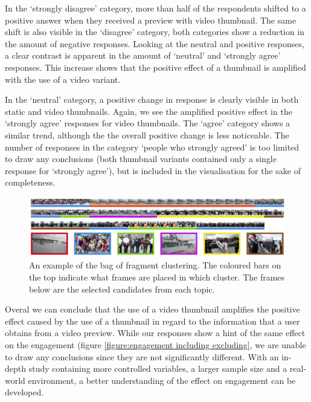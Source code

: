 \documentclass{../resources/sig-alternate-05-2015}
\begin{document}
In the `strongly disagree' category, more than half of the respondents shifted to a positive answer when they received a preview with video thumbnail. The same shift is also visible in the `disagree' category, both categories show a reduction in the amount of negative responses. Looking at the neutral and positive responses, a clear contrast is apparent in the amount of `neutral' and `strongly agree' responses. This increase shows that the positive effect of a thumbnail is amplified with the use of a video variant.

In the `neutral' category, a positive change in response is clearly visible in both static and video thumbnails. Again, we see the amplified positive effect in the `strongly agree' responses for video thumbnails. The `agree' category shows a similar trend, although the the overall positive change is less noticeable. The number of responses in the category `people who strongly agreed' is too limited to draw any conclusions (both thumbnail variants contained only a single response for `strongly agree'), but is included in the visualisation for the sake of completeness.

\begin{figure}[tb!]
	\centering
	\includegraphics[width=\textwidth]{resources/clustering.png}
	\caption{An example of the bag of fragment clustering. The coloured bars on the top indicate what frames are placed in which cluster. The frames below are the selected candidates from each topic.}
	\label{figure: topic clustering example}
\end{figure}

Overal we can conclude that the use of a video thumbnail amplifies the positive effect caused by the use of a thumbnail in regard to the information that a user obtains from a video preview. While our responses show a hint of the same effect on the engagement (figure \ref{figure:engagement including excluding}, we are unable to draw any conclusions since they are not significantly different. With an in-depth study containing more controlled variables, a larger sample size and a real-world environment, a better understanding of the effect on engagement can be developed.
\end{document}
